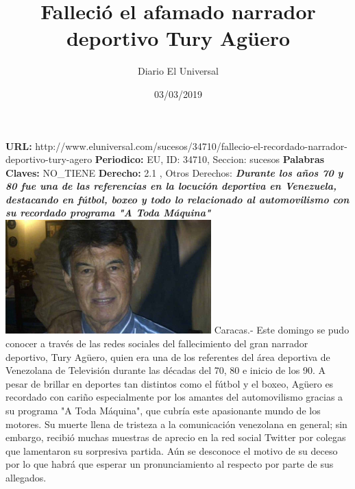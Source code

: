 \documentclass{article}%
\title{\textbf{Falleció el afamado narrador deportivo Tury Agüero}}%
\author{Diario El Universal}%
\date{03/03/2019}%
\begin{document}
%
\normalsize%
\maketitle%
\textbf{URL: }%
http://www.eluniversal.com/sucesos/34710/fallecio{-}el{-}recordado{-}narrador{-}deportivo{-}tury{-}agero\newline%
%
\textbf{Periodico: }%
EU, %
ID: %
34710, %
Seccion: %
sucesos\newline%
%
\textbf{Palabras Claves: }%
NO\_TIENE\newline%
%
\textbf{Derecho: }%
2.1%
, Otros Derechos: %
\newline%
%
\textbf{\textit{Durante los años 70 y 80 fue una de las referencias en la locución deportiva en Venezuela, destacando en fútbol, boxeo y todo lo relacionado al automovilismo con su recordado programa "A Toda Máquina"}}%
\newline%
\newline%
%
\includegraphics[width=300px]{EU_34710.jpg}%
\newline%
%
Caracas.{-} Este domingo se pudo conocer a través de las redes sociales del fallecimiento del gran narrador deportivo, Tury Agüero, quien era una de los referentes del área deportiva de Venezolana de Televisión durante las décadas del 70, 80 e inicio de los 90.%
\newline%
%
A pesar de brillar en deportes tan distintos como el fútbol y el boxeo, Agüero es recordado con cariño especialmente por los amantes del automovilismo gracias a su programa "A Toda Máquina", que cubría este apasionante mundo de los motores.%
\newline%
%
Su muerte llena de tristeza a la comunicación venezolana en general; sin embargo, recibió muchas muestras de aprecio en la red social Twitter por colegas que lamentaron su sorpresiva partida.%
\newline%
%
Aún se desconoce el motivo de su deceso por lo que habrá que esperar un pronunciamiento al respecto por parte de sus allegados.%
\newline%
%
\end{document}
